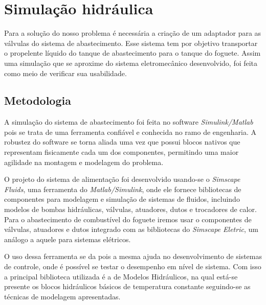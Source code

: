 

\section{Simulação hidráulica}

\par Para a solução do nosso problema é necessária a criação de um adaptador para as válvulas do sistema de abastecimento. Esse sistema tem por objetivo transportar o propelente líquido do tanque de abastecimento para o tanque do foguete. Assim uma simulação que se aproxime do sistema eletromecânico desenvolvido, foi feita como meio de verificar sua usabilidade.

\subsection{Metodologia}

\par A simulação do sistema de abastecimento foi feita no software \textit{Simulink/Matlab} pois se trata de uma ferramenta confiável e conhecida no ramo de engenharia. A robustez do software se torna aliada uma vez que possui blocos nativos que representam fisicamente cada um dos componentes, permitindo uma maior agilidade na montagem e modelagem do problema. 

\par O projeto do sistema de alimentação foi desenvolvido usando-se o \textit{Simscape Fluids}, uma ferramenta do \textit{Matlab/Simulink}, onde ele fornece bibliotecas de componentes para modelagem e simulação de sistemas de fluidos, incluindo modelos de bombas hidráulicas, válvulas, atuadores, dutos e trocadores de calor. Para o abastecimento de combustível do foguete iremos usar o componentes de válvulas, atuadores e dutos integrado com as bibliotecas do \textit{Simscape Eletric}, um análogo a aquele para sistemas elétricos. 

\par O uso dessa ferramenta se da pois a mesma ajuda no desenvolvimento de sistemas de controle, onde é possível se testar o desempenho em nível de sistema. Com isso a principal biblioteca utilizada é a de Modelos Hidráulicos, na qual está-se presente os blocos hidráulicos básicos de temperatura constante seguindo-se as técnicas de modelagem apresentadas.

